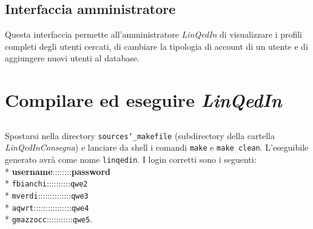 \documentclass{article}
\begin{document}
\subsection {Interfaccia amministratore}
Questa interfaccia permette all'amministratore \textit{LinQedIn} di visualizzare i profili completi degli utenti cercati, di cambiare la tipologia
di account di un utente e di aggiungere nuovi utenti al database.

\section{Compilare ed eseguire \textit{LinQedIn}}
\subsection {}
Spostarsi nella directory \texttt{sources\char`_makefile} (subdirectory della cartella \textit{LinQedInConsegna}) e lanciare da shell
i comandi \texttt{make} e \texttt{make clean}. L'eseguibile generato avrà come nome \texttt{linqedin}.
I login corretti sono i seguenti:   \\*
\textbf{username}::::::::\textbf{password} \\*
\texttt{fbianchi}::::::::::\texttt{qwe2}   \\*
\texttt{mverdi}::::::::::::::\texttt{qwe3}   \\*
\texttt{aqwrt}::::::::::::::::\texttt{qwe4}   \\*
\texttt{gmazzocc}:::::::::::\texttt{qwe5}.
\end{document}
